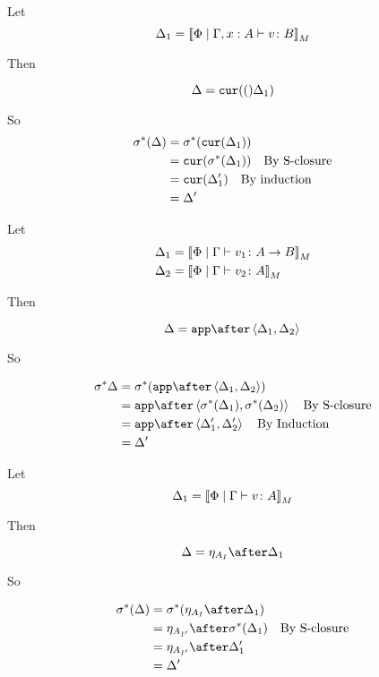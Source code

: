 \documentclass{report}
\renewcommand\star[0]{^*}
\begin{document}
Let \begin{equation}
    \Delta_1 = {\bf [\![}\Phi\mid\Gamma, x: A \vdash v \colon B{\bf ]\!]}_M
\end{equation}

Then

\begin{equation}
    \Delta = \texttt{cur}(()\Delta_1)\\
\end{equation}

So
\begin{align}
    \si\star(\D) & = \si\star(\cur{\D_1})\\
    & = \cur{\si\star(\D_1)}\qt{By S-closure}\\
    & = \cur{\D_1'}\qt{By induction}\\
    & = \D'
\end{align}

Let \begin{align}
    \Delta_1 &= {\bf [\![}\Phi\mid\Gamma \vdash v_1 \colon A\rightarrow B{\bf ]\!]}_M\\
    \Delta_2 &= {\bf [\![}\Phi\mid\Gamma \vdash v_2 \colon A{\bf ]\!]}_M
\end{align}

Then

\begin{equation}
    \D = \app\after\pr{\D_1}{\D_2}\\
\end{equation}

So

\begin{align}
    \si\star\D & = \si\star(\app\after\pr{\D_1}{\D_2})\\
    & = \app\after\pr{\si\star(\D_1)}{\si\star(\D_2)}\qt{By S-closure}\\
    & = \app\after\pr{\D_1'}{\D_2'}\qt{By Induction}\\
    & = \D'
\end{align}

Let \begin{equation}
    \Delta_1 = {\bf [\![}\Phi\mid\Gamma \vdash v \colon A{\bf ]\!]}_M
\end{equation}

Then

\begin{equation}
    \D = \point{A_I}\after \D_1\\
\end{equation}

So

\begin{align}
    \si\star(\D) &= \si\star(\point{A_I}\after \D_1)\\
            & = \point{A_{I'}} \after\si\star(\D_1)\qt{By S-closure}\\
            & = \point{A_{I'}} \after\D_1'\\
            & = \D'
\end{align}
\end{document}
